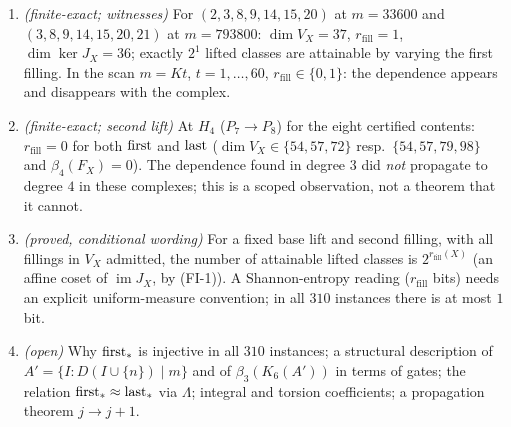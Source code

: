 \begin{theorem}
\begin{enumerate}[label=(J-\arabic*)]
\item \emph{(finite-exact; witnesses)} For $(2,3,8,9,14,15,20)$ at $m=33600$ and $(3,8,9,14,15,20,21)$ at $m=793800$: $\dim V_X=37$, $r_{\mathrm{fill}}=1$, $\dim\ker J_X=36$; exactly $2^1$ lifted classes are attainable by varying the first filling. In the scan $m=Kt$, $t=1,\dots,60$, $r_{\mathrm{fill}}\in\{0,1\}$: the dependence appears and disappears with the complex.
\item \emph{(finite-exact; second lift)} At $H_4$ ($P_7\to P_8$) for the eight certified contents: $r_{\mathrm{fill}}=0$ for both $\mathrm{first}$ and $\mathrm{last}$ ($\dim V_X\in\{54,57,72\}$ resp.\ $\{54,57,79,98\}$ and $\beta_4(F_X)=0$). The dependence found in degree $3$ did \emph{not} propagate to degree $4$ in these complexes; this is a scoped observation, not a theorem that it cannot.
\item \emph{(proved, conditional wording)} For a fixed base lift and second filling, with all fillings in $V_X$ admitted, the number of attainable lifted classes is $2^{r_{\mathrm{fill}}(X)}$ (an affine coset of $\operatorname{im}J_X$, by (FI-1)). A Shannon-entropy reading ($r_{\mathrm{fill}}$ bits) needs an explicit uniform-measure convention; in all $310$ instances there is at most $1$ bit.
\item \emph{(open)} Why $\mathrm{first}_\ast$ is injective in all $310$ instances; a structural description of $A'=\{I:D(I\cup\{n\})\mid m\}$ and of $\beta_3(K_6(A'))$ in terms of gates; the relation $\mathrm{first}_\ast\approx\mathrm{last}_\ast$ via $\Lambda$; integral and torsion coefficients; a propagation theorem $j\to j+1$.
\end{enumerate}

\end{theorem}
